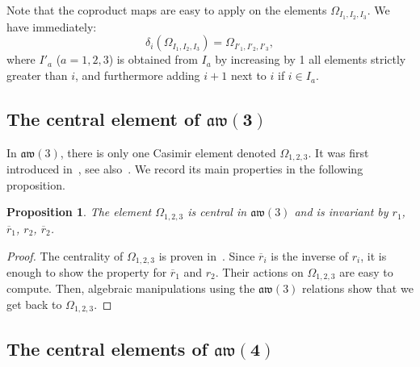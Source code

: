\documentclass[pdftex]{sigma}
\numberwithin{equation}{section}
\newtheorem{prop}[theo]{Proposition}
\theoremstyle{definition}
\newcommand{\rb}{\overline{r}}
\begin{document}
Note that the coproduct maps are easy to apply on the elements $\varOmega_{I_1,I_2,I_3}$. We have immediately:
\begin{equation}\label{eq:deltaOmega}
\delta_i(\varOmega_{I_1,I_2,I_3})=\varOmega_{I'_1,I'_2,I'_3} ,
\end{equation}
where $I'_a$ ($a=1,2,3$) is obtained from $I_a$ by increasing by 1 all elements strictly greater than $i$, and furthermore adding $i+1$ next to $i$ if $i\in I_a$.

\subsection[The central element of aw(3)]{The central element of $\boldsymbol{\mathfrak{aw}(3)}$}

In $\mathfrak{aw}(3)$, there is only one Casimir element denoted $\varOmega_{1,2,3}$.
It was first introduced in~\cite{Zh2}, see also~\cite{avatar, Zh}. We record its main properties in the following proposition.

\begin{prop}\label{propcas3}
The element $\varOmega_{1,2,3}$ is central in $\mathfrak{aw}(3)$ and is invariant by $r_1$, $\rb_1$, $r_2$, $\rb_2$.
\end{prop}
\begin{proof}
The centrality of $\varOmega_{1,2,3}$ is proven in~\cite{Zh2}. Since $\rb_i$ is the inverse of $r_i$, it is enough to show the property for $\rb_1$ and $r_2$.
Their actions on $\varOmega_{1,2,3}$ are easy to compute. Then, algebraic manipulations using the $\mathfrak{aw}(3)$ relations show that we get back to $\varOmega_{1,2,3}$.
\end{proof}


\subsection[The central elements of aw(4)]{The central elements of $\boldsymbol{\mathfrak{aw}(4)}$}
\end{document}
